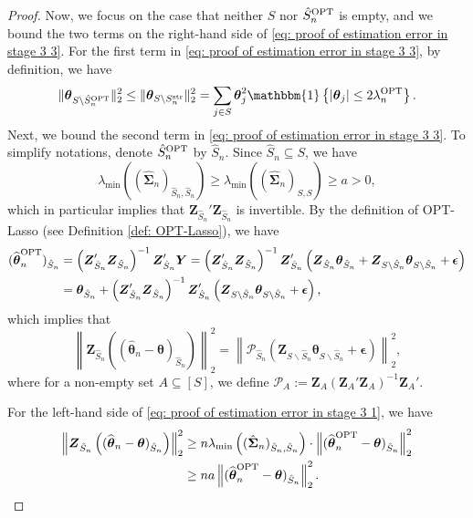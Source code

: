 \documentclass[aos,preprint]{imsart}
\theoremstyle{plain}
\theoremstyle{definition}
\newcommand{\btheta}{\boldsymbol{\theta}}
\newcommand{\bd}[1]{\boldsymbol{#1}}
\newcommand{\hbtheta}{\widehat{\boldsymbol{\theta}}}
\newcommand{\idf}{\mathbbm{1}}
\newcommand{\lmin}[1]{\lambda_{\min}\left(#1\right)}
\newcommand{\ptheta}{\widehat{\boldsymbol{\theta}}^{\textup{OPT}}}
\newcommand{\bY}{\boldsymbol{Y}}
\newcommand{\hdlambda}{\lambda^{\textup{OPT}}}
\newcommand{\bZ}{\boldsymbol{Z}}
\newcommand{\pS}{\hat{S}^{\textup{OPT}}}
\newcommand{\hdS}{\hat{S}^{\textup{OPT}}}
\newcommand{\hbSigma}{\hat{\boldsymbol{\Sigma}}}
\newcommand{\bepsilon}{\bd{\epsilon}}
\begin{document}
\begin{appendix}
\begin{proof}
Now, we focus on the case that neither $S$ nor $\hdS_n$ is empty, and we bound the two terms on the right-hand side of \eqref{eq: proof of estimation error in stage 3 3}. For the first term in \eqref{eq: proof of estimation error in stage 3 3}, by definition, we have 
\begin{equation}\label{eq: proof of estimation error in stage 3 4}
    \|\btheta_{S\backslash\hdS_n}\|_2^2 \le \|\btheta_{S\backslash S_n^{\textup{str}}}\|_2^2 = \sum_{j\in S} \btheta_j^2 \idf\left\{\left|\btheta_j\right| \le 2\hdlambda_n \right\}.
\end{equation}
Next, we bound the second term in \eqref{eq: proof of estimation error in stage 3 3}. To simplify notations, denote $\pS_n$ by $\hat{S}_n$. Since
$\hat{S}_n \subseteq S$, we have
$$\lmin{(\hbSigma_n)_{\hat{S}_n,\hat{S}_n}}\ge \lmin{(\hbSigma_n)_{S,S}} \geq a > 0,$$
which in particular implies that $\bZ_{\hat{S}_n}' \bZ_{\hat{S}_n}$ is invertible. By the definition of OPT-Lasso (see Definition \ref{def: OPT-Lasso}),  we have
\begin{align*}
    (\ptheta_n)_{\hat{S}_n} &= \left(\bZ_{\hat{S}_n}' \bZ_{\hat{S}_n} \right)^{-1}\bZ_{\hat{S}_n}'\bY
    = \left(\bZ_{\hat{S}_n}' \bZ_{\hat{S}_n} \right)^{-1}\bZ_{\hat{S}_n}'\left(\bZ_{\hat{S}_n}\btheta_{\hat{S}_n} + \bZ_{S\backslash\hat{S}_n}\btheta_{S\backslash\hat{S}_n} + \bepsilon \right)
    \\&= \btheta_{\hat{S}_n} + \left(\bZ_{\hat{S}_n}' \bZ_{\hat{S}_n} \right)^{-1}\bZ_{\hat{S}_n}'\left( \bZ_{S\backslash\hat{S}_n}\btheta_{S\backslash\hat{S}_n} + \bepsilon \right),
\end{align*}
which implies that
\begin{equation} 
\label{eq: proof of estimation error in stage 3 1}
    \left\|\bZ_{\hat{S}_n}\left((\hbtheta_n-\btheta)_{\hat{S}_n} \right)\right\|_2^2 = \left\|\mathcal{P}_{\hat{S}_n} \left( \bZ_{S\backslash\hat{S}_n}\btheta_{S\backslash
    \hat{S}_n} + \bepsilon \right)\right\|_2^2,
\end{equation}
where for a non-empty set $A \subseteq [S]$, we define
$\mathcal{P}_{A}:=\bZ_A\left(\bZ_A'\bZ_A \right)^{-1}\bZ_A'$. 


For the left-hand side of \eqref{eq: proof of estimation error in stage 3 1}, we have
\begin{equation}\label{eq: proof of estimation error in stage 3 5}
\begin{split}
\left\|\bZ_{\hat{S}_n}\left((\hbtheta_n-\btheta)_{\hat{S}_n} \right)\right\|_2^2 
&\geq    n\lmin{(\hbSigma_n)_{\hat{S}_n,\hat{S}_n}}\cdot \left\|(\ptheta_n-\btheta)_{\hat{S}_n} \right\|_2^2 \\
    &\geq n a \left\|(\ptheta_n-\btheta)_{\hat{S}_n} \right\|_2^2.
\end{split}
\end{equation}


\end{proof}
\end{appendix}
\end{document}
